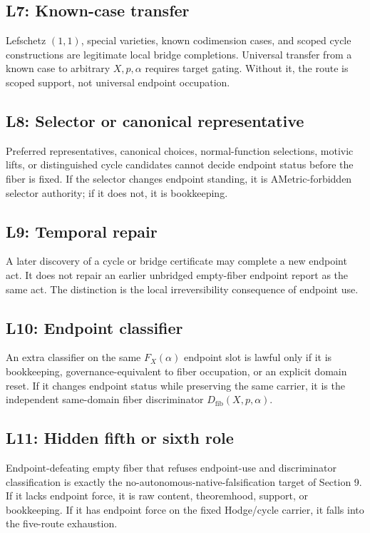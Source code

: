 \documentclass[11pt]{article}
\begin{document}
\subsection*{L7: Known-case transfer}
Lefschetz $(1,1)$, special varieties, known codimension cases, and scoped cycle constructions are legitimate local bridge completions.  Universal transfer from a known case to arbitrary $X,p,\alpha$ requires target gating.  Without it, the route is scoped support, not universal endpoint occupation.

\subsection*{L8: Selector or canonical representative}
Preferred representatives, canonical choices, normal-function selections, motivic lifts, or distinguished cycle candidates cannot decide endpoint status before the fiber is fixed.  If the selector changes endpoint standing, it is AMetric-forbidden selector authority; if it does not, it is bookkeeping.

\subsection*{L9: Temporal repair}
A later discovery of a cycle or bridge certificate may complete a new endpoint act.  It does not repair an earlier unbridged empty-fiber endpoint report as the same act.  The distinction is the local irreversibility consequence of endpoint use.

\subsection*{L10: Endpoint classifier}
An extra classifier on the same $F_X(\alpha)$ endpoint slot is lawful only if it is bookkeeping, governance-equivalent to fiber occupation, or an explicit domain reset.  If it changes endpoint status while preserving the same carrier, it is the independent same-domain fiber discriminator $D_{\mathrm{fib}}(X,p,\alpha)$.

\subsection*{L11: Hidden fifth or sixth role}
Endpoint-defeating empty fiber that refuses endpoint-use and discriminator classification is exactly the no-autonomous-native-falsification target of Section 9.  If it lacks endpoint force, it is raw content, theoremhood, support, or bookkeeping.  If it has endpoint force on the fixed Hodge/cycle carrier, it falls into the five-route exhaustion.
\end{document}
